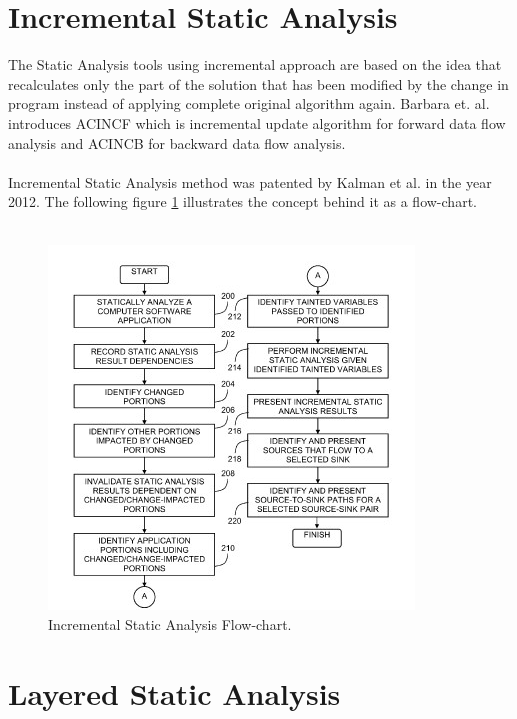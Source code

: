 \section{Incremental Static Analysis}

The Static Analysis tools using incremental approach are based on the idea that recalculates only the part of the solution that has been modified by the change in program instead of applying complete original algorithm again. Barbara et. al. introduces ACINCF which is incremental update algorithm for forward data flow analysis and ACINCB for backward data flow analysis. \\ \\

Incremental Static Analysis method was patented by Kalman et al. in the year 2012. The following figure \ref{fig:inc-analysis-fc} illustrates the concept behind it as a flow-chart. \\ \\

\begin{figure}[H]
	\centering
	\includegraphics[width=\linewidth]{figures/inc-analysis-fc}
	\caption{Incremental Static Analysis Flow-chart.}
	\label{fig:inc-analysis-fc}
\end{figure}


\section{Layered Static Analysis}

